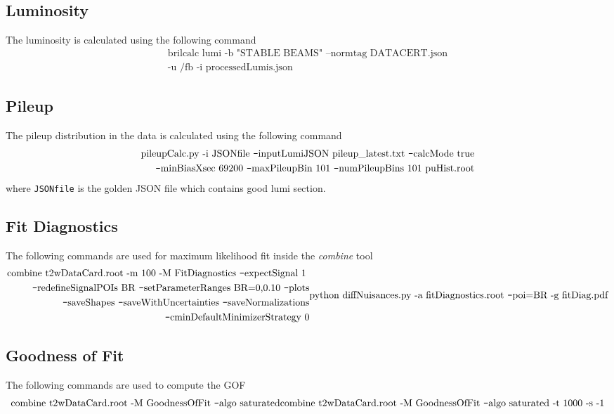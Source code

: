 \subsection*{Luminosity}
 The luminosity is calculated using the following command
\begin{align}
\text{brilcalc  lumi  -b  "STABLE BEAMS" --normtag DATACERT.json} \nonumber \\  
\text{-u  /fb -i processedLumis.json}
\label{cmd:lumiCalc}
\end{align}

\subsection*{Pileup}
The pileup distribution in the data is calculated using the following command 
\begin{align}
\text{pileupCalc.py -i JSONfile \texttt{--}inputLumiJSON pileup\_latest.txt  
\texttt{--}calcMode true} \nonumber \\
\text{\texttt{--}minBiasXsec 69200 \texttt{--}maxPileupBin 101 \texttt{--}numPileupBins 101  puHist.root}
\label{cmd:pileupCalc}
\end{align}
where \verb|JSONfile| is the golden JSON file which contains good lumi section.

\subsection*{Fit Diagnostics}
The following commands are used for maximum likelihood fit inside the \textit{combine} tool
\begin{subequations}
\begin{align}
\text{combine t2wDataCard.root -m 100 -M FitDiagnostics \texttt{--}expectSignal 1 \nonumber} \\
	\text{\texttt{--}redefineSignalPOIs BR \texttt{--}setParameterRanges BR=0,0.10 \texttt{--}plots} \nonumber \\
	\text{\texttt{--}saveShapes \texttt{--}saveWithUncertainties  \texttt{--}saveNormalizations} \nonumber \\
	\text{\texttt{--}cminDefaultMinimizerStrategy 0}
\end{align}    
\begin{align}
\text{python diffNuisances.py -a fitDiagnostics.root \texttt{--}poi=BR -g fitDiag.pdf}
\end{align}
\label{cmd:fitDiag}
\end{subequations}

\subsection*{Goodness of Fit}
The following commands are used to compute the GOF
\begin{subequations}
\begin{align}
\text{combine t2wDataCard.root -M GoodnessOfFit \texttt{--}algo saturated}
\end{align}    
\begin{align}
\text{combine t2wDataCard.root -M GoodnessOfFit \texttt{--}algo saturated -t 1000 -s -1}
\end{align}
\label{cmd:GOF}
\end{subequations}


